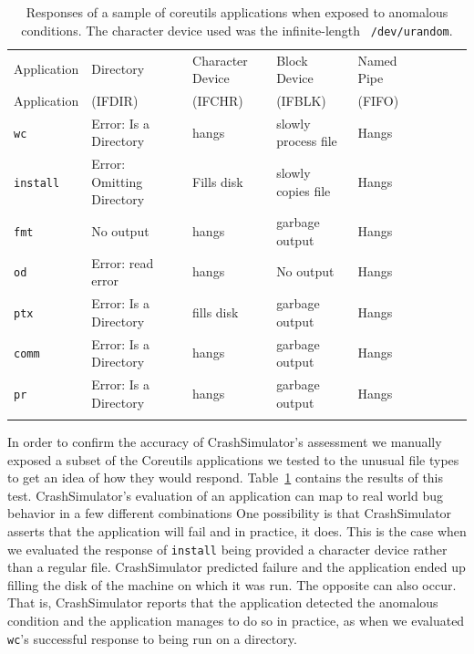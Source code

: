 \begin{table}[t]
    \scriptsize{}
    \begin{tabular}{l  l  l  l  l  l  l  l  l}
    \toprule{}
        Application         & Directory                 & Character Device & Block Device  & Named Pipe \\
        Application         & (IFDIR)                   & (IFCHR) & (IFBLK) & (FIFO) \\
\hline
        {\tt wc}            & Error: Is a Directory     & hangs       & slowly process file  & Hangs\\
        {\tt install}       & Error: Omitting Directory & Fills disk  & slowly copies file   & Hangs\\
        {\tt fmt}           & No output                 & hangs       & garbage output       & Hangs\\
        {\tt od}            & Error: read error         & hangs       & No output            & Hangs\\
        {\tt ptx}           & Error: Is a Directory     & fills disk  & garbage output       & Hangs\\
        {\tt comm}          & Error: Is a Directory     & hangs       & garbage output       & Hangs\\
        {\tt pr}            & Error: Is a Directory     & hangs       & garbage output       & Hangs\\
\hline
    \bottomrule{}
    \end{tabular}
    \caption{Responses of a sample of coreutils applications when exposed to
      anomalous conditions.  The character device used was the infinite-length {\tt
        /dev/urandom}.}
    \label{table:applicationresponses}
\end{table}


In order to confirm the accuracy of CrashSimulator's assessment we manually
exposed a subset of the Coreutils applications we tested to the unusual
file types to get an idea of how they would respond.
Table~\ref{table:applicationresponses} contains the results of this test.
CrashSimulator's evaluation of an application can map to real world bug behavior
in a few different combinations
One
possibility is that CrashSimulator asserts that the application will fail
and in practice, it does.  This is the case when we evaluated
the response of  {\tt install} being provided a character device
rather than a regular file. CrashSimulator predicted failure and the
application ended up filling the disk of the machine on which it was run.  The
opposite can also occur.  That is, CrashSimulator reports that the
application detected the anomalous condition and the application manages to
do so in practice,  as when we evaluated {\tt wc}'s successful response to
being run on a directory.

